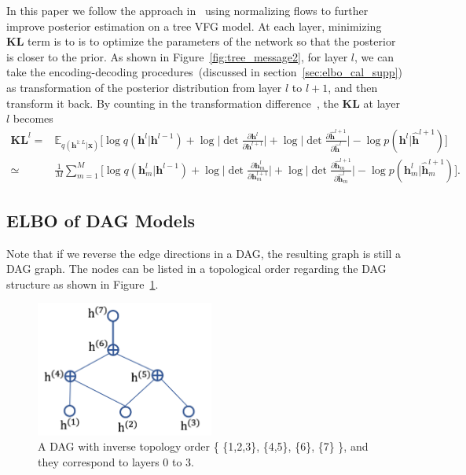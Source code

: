 \documentclass[twoside]{article}
\begin{document}
In this paper we follow the approach in~\cite{rezende2015variational,kingma2016improving,berg2018sylvester}  using normalizing flows to further improve posterior estimation on a tree VFG model. At each layer,  minimizing  $\mathbf{KL}$ term is to is to optimize the parameters of the network so that the posterior is closer to the prior. As shown in Figure~\ref{fig:tree_message2}, for layer $l$,  we can take the  encoding-decoding procedures~(discussed in section~\ref{sec:elbo_cal_supp}) as transformation of the posterior distribution from layer $l$ to $l+1$, and then transform it back. By  counting in the transformation difference~\cite{rezende2015variational,kingma2016improving,berg2018sylvester}, the $\mathbf{KL}$ at layer $l$ becomes 
\begin{align*}
\mathbf{KL}^l=&\mathbb{E}_{q(\mathbf{h}^{1:L}|\mathbf{x})}\bigg[  \log q(\mathbf{h}^{l}|\mathbf{h}^{l-1}) +\log \bigg|\det \frac{\partial \mathbf{h}^{l}}{\partial \mathbf{h}^{l+1}}\bigg| + \log \bigg|\det \frac{\partial \widehat{\mathbf{h}}^{l+1}}{\partial \widehat{\mathbf{h}}^{l}}\bigg|   - \log p(\mathbf{h}^{l}|\widehat{\mathbf{h}}^{l+1}) \bigg]\\
\simeq & \frac{1}{M}\sum_{m=1}^M\bigg[ \log q(\mathbf{h}^{l}_m|\mathbf{h}^{l-1}) +\log \bigg|\det \frac{\partial \mathbf{h}^{l}_m}{\partial \mathbf{h}^{l+1}_m}\bigg| + \log \bigg|\det \frac{\partial \widehat{\mathbf{h}}^{l+1}_m}{\partial \widehat{\mathbf{h}}^{l}_m}\bigg|   - \log p(\mathbf{h}^{l}_m|\widehat{\mathbf{h}}_m^{l+1}) \bigg].
\end{align*}





\subsection{ELBO of DAG Models}\label{appd:dag_elbo}
Note that if we reverse the edge directions in a DAG, the resulting graph is still a DAG graph.  
The nodes can be listed in a topological order regarding the DAG structure as shown in Figure~\ref{fig:dag}. 

\begin{figure}[H]
    \centering
    \includegraphics[width=2.3in]{fig/dag.png}
    \caption{A DAG  with inverse topology order \big\{ \{1,2,3\}, \{4,5\}, \{6\},  \{7\} \big\}, and they  correspond to layers 0 to 3.  }
    \label{fig:dag}
\end{figure}
\end{document}
